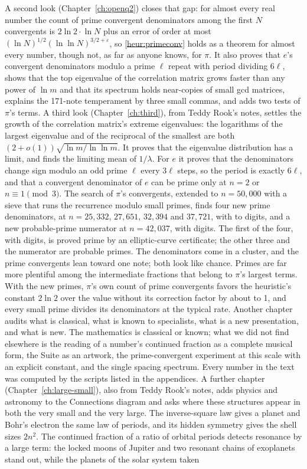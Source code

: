 A second look (Chapter~\ref{ch:openq2}) closes that gap: for almost every real number the count of prime convergent denominators among the first $N$ convergents is $2\ln 2\cdot\ln N$ plus an error of order at most $(\ln N)^{1/2}(\ln\ln N)^{3/2+\varepsilon}$, so \cref{heur:primeconv} holds as a theorem for almost every number, though not, as far as anyone knows, for $\pi$. It also proves that $e$'s convergent denominators modulo a prime $\ell$ repeat with period dividing $6\ell$, shows that the top eigenvalue of the correlation matrix grows faster than any power of $\ln m$ and that its spectrum holds near-copies of small gcd matrices, explains the 171-note temperament by three small commas, and adds two tests of $\pi$'s terms. \addedon{\revB} A third look (Chapter~\ref{ch:third}), from Teddy Rook's notes, settles the growth of the correlation matrix's extreme eigenvalues: the logarithms of the largest eigenvalue and of the reciprocal of the smallest are both $(2 + o(1))\sqrt{\ln m/\ln\ln m}$. It proves that the eigenvalue distribution has a limit, and finds the limiting mean of $1/\lambda$. For $e$ it proves that the denominators change sign modulo an odd prime $\ell$ every $3\ell$ steps, so the period is exactly $6\ell$, and that a convergent denominator of $e$ can be prime only at $n = 2$ or $n \equiv 1 \pmod 3$. The search of $\pi$'s convergents, extended to $n = 50{,}000$ with a sieve that runs the recurrence modulo small primes, finds four new prime denominators, at $n = 25{,}332$, $27{,}651$, $32{,}394$ and $37{,}721$, with \ThDigits{} to \FoDigits{} digits, and a new probable-prime numerator at $n = 42{,}037$, with \FiDigits{} digits. The first of the four, with \ThDigits{} digits, is proved prime by an elliptic-curve certificate; the other three and the numerator are probable primes. \addedon{\revG} The denominators come in a cluster, and the prime convergents lean toward one note; both look like chance. Primes are far more plentiful among the intermediate fractions that belong to $\pi$'s largest terms. With the new primes, $\pi$'s own count of prime convergents favors the heuristic's constant $2\ln 2$ over the value without its correction factor by about \RaFiLR{} to 1, and every small prime divides its denominators at the typical rate. \addedon{\revC} Another chapter audits what is classical, what is known to specialists, what is a new presentation, and what is new. The mathematics is classical or known; what we did not find elsewhere is the reading of a number's continued fraction as a complete musical form, the Suite as an artwork, the prime-convergent experiment at this scale with an explicit constant, and the single spacing spectrum. Every number in the text was computed by the scripts listed in the appendices. A further chapter (Chapter~\ref{ch:large-small}), also from Teddy Rook's notes, adds physics and astronomy to the Connections diagram and asks where these structures appear in both the very small and the very large. The inverse-square law gives a planet and Bohr's electron the same law of periods, and its hidden symmetry gives the shell sizes $2n^2$. The continued fraction of a ratio of orbital periods detects resonance by a large term: the locked moons of Jupiter and two resonant chains of exoplanets stand out, while the planets of the solar system taken 